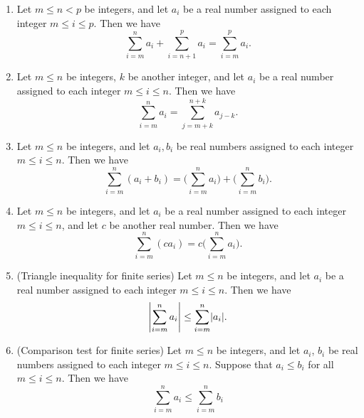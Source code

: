\begin{lemma}\label{7.1.4}
    \mbox{}
    \begin{enumerate}
        \item Let \(m \leq n < p\) be integers, and let \(a_i\) be a real number assigned to each integer \(m \leq i \leq p\).
              Then we have
              \[
                  \sum_{i = m}^n a_i + \sum_{i = n + 1}^p a_i = \sum_{i = m}^p a_i.
              \]
        \item Let \(m \leq n\) be integers, \(k\) be another integer, and let \(a_i\) be a real number assigned to each integer \(m \leq i \leq n\).
              Then we have
              \[
                  \sum_{i = m}^n a_i = \sum_{j = m + k}^{n + k} a_{j - k}.
              \]
        \item Let \(m \leq n\) be integers, and let \(a_i, b_i\) be real numbers assigned to each integer \(m \leq i \leq n\).
              Then we have
              \[
                  \sum_{i = m}^n (a_i + b_i) = \Bigg(\sum_{i = m}^n a_i\Bigg) + \Bigg(\sum_{i = m}^n b_i\Bigg).
              \]
        \item Let \(m \leq n\) be integers, and let \(a_i\) be a real number assigned to each integer \(m \leq i \leq n\), and let \(c\) be another real number.
              Then we have
              \[
                  \sum_{i = m}^n (ca_i) = c\Bigg(\sum_{i = m}^n a_i\Bigg).
              \]
        \item (Triangle inequality for finite series)
              Let \(m \leq n\) be integers, and let \(a_i\) be a real number assigned to each integer \(m \leq i \leq n\).
              Then we have
              \[
                  \abs*{\sum_{i = m}^n a_i} \leq \sum_{i = m}^n \abs*{a_i}.
              \]
        \item (Comparison test for finite series) Let \(m \leq n\) be integers, and let \(a_i\), \(b_i\) be real numbers assigned to each integer \(m \leq i \leq n\).
              Suppose that \(a_i \leq b_i\) for all \(m \leq i \leq n\).
              Then we have
              \[
                  \sum_{i = m}^n a_i \leq \sum_{i = m}^n b_i
              \]
    \end{enumerate}
\end{lemma}

